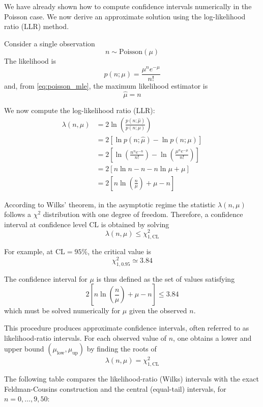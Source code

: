 \begin{example}\label{ex:llr_poissonian}
	We have already shown how to compute confidence intervals numerically in the Poisson case. We now derive an approximate solution using the log-likelihood ratio (LLR) method.
	
	Consider a single observation
	\[
	n \sim \text{Poisson}(\mu)
	\]
	The likelihood is
	\[
	p(n;\mu) = \frac{\mu^n e^{-\mu}}{n!}
	\]
	and, from \ref{eq:poisson_mle}, the maximum likelihood estimator is
	\[
	\hat\mu = n
	\]

	We now compute the log-likelihood ratio (LLR):
	\begin{align*}
		\lambda(n, \mu)
		&= 2 \ln \left(\frac{p(n;\hat\mu)}{p(n;\mu)}\right) \\
		&= 2 \left[ \ln p(n; \hat\mu) - \ln p(n;\mu) \right] \\
		&= 2 \left[ \ln \left(\frac{n^n e^{-n}}{n!}\right) - \ln \left(\frac{\mu^n e^{-\mu}}{n!}\right) \right] \\
		&= 2 \left[ n \ln n - n - n \ln \mu + \mu \right] \\
		&= 2 \left[ n \ln \left(\frac{n}{\mu}\right) + \mu - n \right]
	\end{align*}
	
	According to Wilks' theorem, in the asymptotic regime the statistic $\lambda(n,\mu)$ follows a $\chi^2$ distribution with one degree of freedom. Therefore, a confidence interval at confidence level $\mathrm{CL}$ is obtained by solving
	\[
	\lambda(n,\mu) \leq \chi^2_{1,\mathrm{CL}}
	\]
	
	For example, at $\mathrm{CL}=95\%$, the critical value is
	\[
	\chi^2_{1,0.95} \simeq 3.84
	\]
	
	The confidence interval for $\mu$ is thus defined as the set of values satisfying
	\[
	2 \left[ n \ln \left(\frac{n}{\mu}\right) + \mu - n \right] \leq 3.84
	\]
	which must be solved numerically for $\mu$ given the observed $n$.
	
	This procedure produces approximate confidence intervals, often referred to as likelihood-ratio intervals. For each observed value of $n$, one obtains a lower and upper bound $(\mu_\text{low}, \mu_\text{up})$ by finding the roots of
	\[
	\lambda(n,\mu) = \chi^2_{1,\mathrm{CL}}
	\]
	
	The following table compares the likelihood-ratio (Wilks) intervals with the exact Feldman-Cousins construction and the central (equal-tail) intervals, for $n = 0, \dots, 9, 50$:
	
	
	

\end{example}
